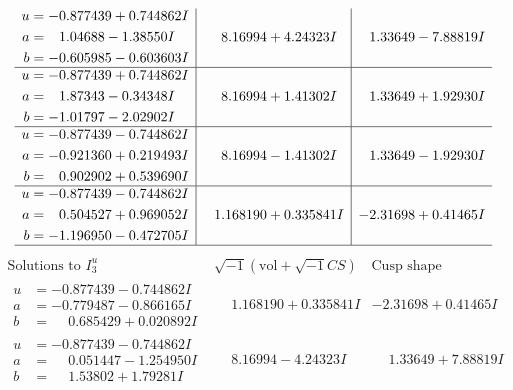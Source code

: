 \documentclass[1p]{elsarticle_modified}
\theoremstyle{definition}
\newcommand{\I}{\sqrt{-1}}
\begin{document}
$$\begin{array}{c|c|c}
\begin{aligned}
u &= -0.877439 + 0.744862 I \\
a &= \phantom{-}1.04688 - 1.38550 I \\
b &= -0.605985 - 0.603603 I\end{aligned}
 & \phantom{-}8.16994 + 4.24323 I & \phantom{-}1.33649 - 7.88819 I \\ \hline\begin{aligned}
u &= -0.877439 + 0.744862 I \\
a &= \phantom{-}1.87343 - 0.34348 I \\
b &= -1.01797 - 2.02902 I\end{aligned}
 & \phantom{-}8.16994 + 1.41302 I & \phantom{-}1.33649 + 1.92930 I \\ \hline\begin{aligned}
u &= -0.877439 - 0.744862 I \\
a &= -0.921360 + 0.219493 I \\
b &= \phantom{-}0.902902 + 0.539690 I\end{aligned}
 & \phantom{-}8.16994 - 1.41302 I & \phantom{-}1.33649 - 1.92930 I \\ \hline\begin{aligned}
u &= -0.877439 - 0.744862 I \\
a &= \phantom{-}0.504527 + 0.969052 I \\
b &= -1.196950 - 0.472705 I\end{aligned}
 & \phantom{-}1.168190 + 0.335841 I & -2.31698 + 0.41465 I\\
 \hline 
 \end{array}$$\newpage$$\begin{array}{c|c|c}  
\text{Solutions to }I^u_{3}& \I (\text{vol} + \sqrt{-1}CS) & \text{Cusp shape}\\
 \hline 
\begin{aligned}
u &= -0.877439 - 0.744862 I \\
a &= -0.779487 - 0.866165 I \\
b &= \phantom{-}0.685429 + 0.020892 I\end{aligned}
 & \phantom{-}1.168190 + 0.335841 I & -2.31698 + 0.41465 I \\ \hline\begin{aligned}
u &= -0.877439 - 0.744862 I \\
a &= \phantom{-}0.051447 - 1.254950 I \\
b &= \phantom{-}1.53802 + 1.79281 I\end{aligned}
 & \phantom{-}8.16994 - 4.24323 I & \phantom{-}1.33649 + 7.88819 I \\ \hline\begin{aligned}

\end{aligned}
\end{array}$$
\end{document}
